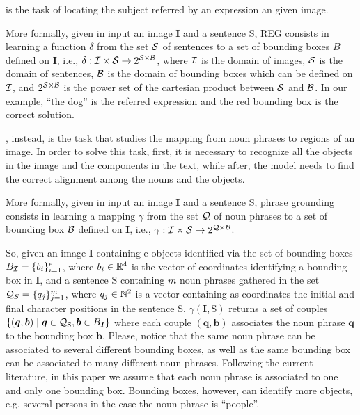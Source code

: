  is the task of locating
the subject referred by an expression an given image. 

More formally,
given in input an image $\bm{I}$ and a sentence $\mathrm{S}$, REG
consists in learning a function $\delta$ from the set $\mathcal{S}$ of
sentences to a set of bounding boxes $B$ defined on $\bm{I}$, i.e.,
$\delta: \mathcal{I} \times \mathcal{S} \rightarrow 2^{\mathcal{S} \times \mathcal{B}}$, where
$\mathcal{I}$ is the domain of images, $\mathcal{S}$ is the domain of sentences,
$\mathcal{B}$ is the domain of bounding boxes which can be defined on
$\mathcal{I}$, and $2^{\mathcal{S} \times \mathcal{B}}$ is the power set of the
cartesian product between $\mathcal{S}$ and $\mathcal{B}$. In our example, ``the
dog'' is the referred expression and the red bounding box is the
correct solution.

, instead, is the task that studies the
mapping from noun phrases to regions of an image. In order to solve
this task, first, it is necessary to recognize all the objects in the
image and the components in the text, while after, the model needs to
find the correct alignment among the nouns and the objects.

More formally, given in input an image $\bm{I}$ and a sentence
$\mathrm{S}$, phrase grounding consists in learning a mapping $\gamma$
from the set $\mathcal{Q}$ of noun phrases to a set of bounding box $\mathcal{B}$
defined on $\bm{I}$, i.e., $\gamma : \mathcal{I} \times \mathcal{S} \rightarrow
2^{\mathcal{Q} \times \mathcal{B}}$. 

So, given an image $\bm{I}$ containing e objects identified via the
set of bounding boxes $B_{\mathcal{I}} = \{ b_i \}^e_{i=1}$, where $b_i \in
\mathbb{R}^4$ is the vector of coordinates identifying a bounding box in
$\bm{I}$, and a sentence $\mathrm{S}$ containing $m$ noun phrases
gathered in the set $\mathcal{Q}_S = \{ q_j \}^m_{j=1}$, where $q_j \in
\mathbb{N}^2$ is a vector containing as coordinates the initial and final
character positions in the sentence $\mathrm{S}$, $\gamma(\bm{I},
\mathrm{S})$ returns a set of couples $\{ (\bm{q}, \bm{b}) \mid \bm{q}
\in \mathcal{Q}_{\mathrm{S}}, \bm{b} \in B_{\bm{I}} \}$ where each couple
$(\bm{q}, \bm{b})$ associates the noun phrase $\bm{q}$ to the bounding
box $\bm{b}$. Please, notice that the same noun phrase can be
associated to several different bounding boxes, as well as the same
bounding box can be associated to many different noun phrases.
Following the current literature, in this paper we assume that each
noun phrase is associated to one and only one bounding box. Bounding
boxes, however, can identify more objects, e.g. several persons in the
case the noun phrase is ``people''.

